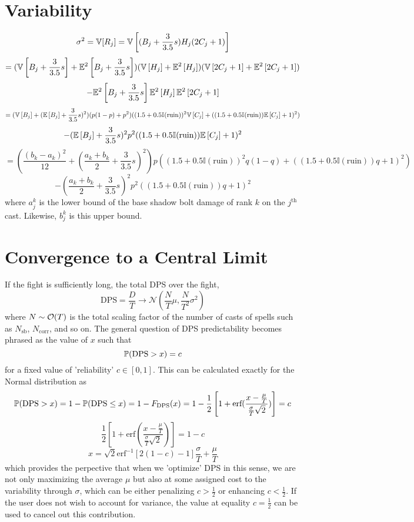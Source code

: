 \section*{Variability}
%
$$
\sigma^2 = \V[R_j] = \V\left[ (B_j + \frac{3}{3.5} s) H_j (2 C_j + 1) \right]
$$
$$
= (\V\left[ B_j + \frac{3}{3.5} s \right] + \E^2\left[ B_j + \frac{3}{3.5} s \right])
(\V\left[ H_j \right] + \E^2\left[ H_j \right])
(\V\left[ 2 C_j + 1 \right] + \E^2\left[ 2 C_j + 1 \right])
$$
$$
- \E^2\left[ B_j + \frac{3}{3.5} s \right] \E^2\left[ H_j \right] \E^2\left[ 2 C_j + 1 \right]
$$
$$
= (\V\left[ B_j \right] + ( \E\left[ B_j \right] + \frac{3}{3.5} s)^2)
(p (1 - p) + p^2)
( (1.5 + 0.5 \mathbb{I}(\text{ruin}))^2 \V\left[ C_j \right] + ((1.5 + 0.5 \mathbb{I}(\text{ruin})) \E\left[ C_j \right] + 1)^2)
$$
$$
- (\E\left[ B_j \right] + \frac{3}{3.5} s)^2 p^2 ((1.5 + 0.5 \mathbb{I}(\text{ruin})) \E\left[ C_j \right] + 1)^2
$$
$$
= (\frac{(b_k-a_k)^2}{12} + ( \frac{a_k + b_k}{2} + \frac{3}{3.5} s)^2)
p
( (1.5 + 0.5 \mathbb{I}(\text{ruin}))^2 q (1 - q) + ((1.5 + 0.5 \mathbb{I}(\text{ruin})) q + 1)^2)
$$
$$
- (\frac{a_k + b_k}{2} + \frac{3}{3.5} s)^2 p^2 ((1.5 + 0.5 \mathbb{I}(\text{ruin})) q + 1)^2
$$
%
where $a_j^k$ is the lower bound of the base shadow bolt damage of rank $k$ on the $j^\text{th}$ cast. Likewise, $b_j^k$ is this upper bound.



\section*{Convergence to a Central Limit}
%
If the fight is sufficiently long, the total DPS over the fight,
%
$$
\text{DPS} = \frac{D}{T}
\rightarrow \mathcal{N}(\frac{N}{T} \mu, \frac{N}{T^2} \sigma^2)
$$
%
where $N \sim \bigO(T)$ is the total scaling factor of the number of casts of spells such as $N_\text{sb}$, $N_\text{corr}$, and so on. The general question of DPS predictability becomes phrased as the value of $x$ such that
%
$$
\P(\text{DPS} > x) = c
$$
%
for a fixed value of 'reliability' $c \in [0,1]$. This can be calculated exactly for the Normal distribution as
%
$$
\P(\text{DPS} > x) = 1 - \P(\text{DPS} \leq x)
= 1 - F_\text{DPS}(x)
= 1 - \frac{1}{2} \left[ 1 + \text{erf}(\frac{ x - \frac{\mu}{T} }{ \frac{\sigma}{T} \sqrt{2} }) \right] = c
$$
%
$$
\frac{1}{2} \left[ 1 + \text{erf}(\frac{ x - \frac{\mu}{T} }{ \frac{\sigma}{T} \sqrt{2} }) \right] = 1 - c
$$
$$
x = \sqrt{2} \text{erf}^{-1} \left[ 2 (1 - c) - 1 \right] \frac{\sigma}{T} + \frac{\mu}{T}
$$
%
which provides the perpective that when we 'optimize' DPS in this sense, we are not only maximizing the average $\mu$ but also at some assigned cost to the variability through $\sigma$, which can be either penalizing $c > \frac{1}{2}$ or enhancing $c < \frac{1}{2}$. If the user does not wish to account for variance, the value at equality $c = \frac{1}{2}$ can be used to cancel out this contribution.



